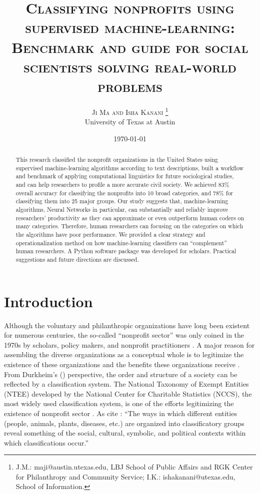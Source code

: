 \documentclass[11pt]{article}
\title{{\textsc{Classifying nonprofits using supervised machine-learning: Benchmark and guide for social scientists solving real-world problems}}}
\author{%
\textsc{Ji Ma and Isha Kanani} \thanks{J.M.: maji@austin.utexas.edu, LBJ School of Public Affairs and RGK Center for Philanthropy and Community Service; I.K.: ishakanani@utexas.edu, School of Information.} \\[1ex] %
\normalsize University of Texas at Austin \\ %
}
\date{\today} %
\begin{document}
\RaggedRight

\maketitle

\begin{abstract}

This research classified the nonprofit organizations in the United States using supervised machine-learning algorithms according to text descriptions, built a workflow and benchmark of applying computational linguistics for future sociological studies, and can help researchers to profile a more accurate civil society. We achieved 83\% overall accuracy for classifying the nonprofits into 10 broad categories, and 78\% for classifying them into 25 major groups. Our study suggests that, machine-learning algorithms, Neural Networks in particular, can substantially and reliably improve researchers' productivity as they can approximate or even outperform human coders on many categories. Therefore, human researchers can focusing on the categories on which the algorithms have poor performance. We provided a clear strategy and operationalization method on how machine-learning classifiers can ``complement'' human researchers. A Python software package was developed for scholars. Practical suggestions and future directions are discussed. 

\end{abstract}
\clearpage

\tableofcontents
\listoftables
\listoffigures
\clearpage

\section{Introduction}

Although the voluntary and philanthropic organizations have long been existent for numerous centuries, the so-called ``nonprofit sector'' was only coined in the 1970s by scholars, policy makers, and nonprofit practitioners \parencite{HallHistoricalOverviewPhilanthropy2006}. A major reason for assembling the diverse organizations as a conceptual whole is to legitimize the existence of these organizations and the benefits these organizations receive \parencites[54-55]{HallHistoricalOverviewPhilanthropy2006}{BarmanClassificatoryStrugglesNonprofit2013}. From Durkheim's (\citeyear{DurkheimElementaryFormsReligious2012}) perspective, the order and structure of a society can be reflected by a classification system. The National Taxonomy of Exempt Entities (NTEE) developed by the National Center for Charitable Statistics (NCCS), the most widely used classification system, is one of the efforts legitimizing the existence of nonprofit sector \parencite{Hodgkinsonnewresearchplanning1991,HodgkinsonMappingnonprofitsector1990}. As \textcite[105]{BarmanClassificatoryStrugglesNonprofit2013} cite \textcite[601]{ClarkeSimpleTechnologyComplex1996}: ``The ways in which different entities (people, animals, plants, diseases, etc.) are organized into classificatory groups reveal something of the social, cultural, symbolic, and political contexts within which classifications occur.''
\end{document}
